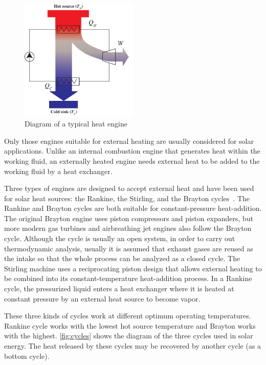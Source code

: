 \begin{figure}[h]
\centering 
\includegraphics[width=0.5\textwidth]{fig/engines}
\caption{Diagram of a typical heat engine}\label{fig:engines}
\end{figure}

Only those engines suitable for external heating are usually considered for solar applications. Unlike an internal combustion engine that generates heat within the working fluid, an externally heated engine needs external heat to be added to the working fluid by a heat exchanger.

Three types of engines are designed to accept external heat and have been used for solar heat sources: the Rankine, the Stirling, and the Brayton cycles~\cite{Roschke1979}. The Rankine and Brayton cycles are both suitable for constant-pressure heat-addition. 
The original Brayton engine uses piston compressors and piston expanders, but more modern gas turbines and airbreathing jet engines also follow the Brayton cycle. Although the cycle is usually an open system, in order to carry out thermodynamic analysis, usually it is assumed that exhaust gases are reused as the intake so that the whole process can be analyzed as a closed cycle.
The Stirling machine uses a reciprocating piston design that allows external heating to be combined into its constant-temperature heat-addition process. 
In a Rankine cycle, the pressurized liquid enters a heat exchanger where it is heated at constant pressure by an external heat source to become vapor.

These three kinds of cycles work at different optimum operating temperatures. Rankine cycle works with the lowest hot source temperature and Brayton works with the highest. \autoref{fig:cycles} shows the diagram of the three cycles used in solar energy. The heat released by these cycles may be recovered by another cycle (as a bottom cycle).


